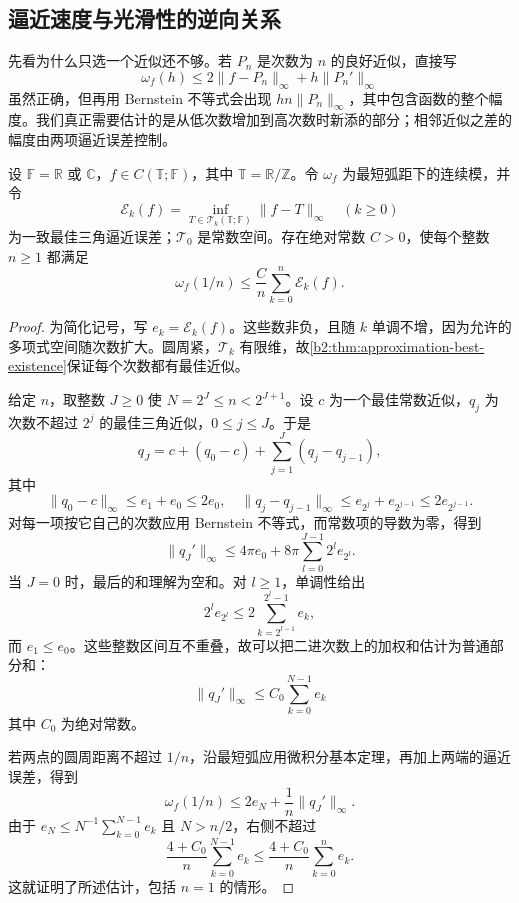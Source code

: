 \subsection{逼近速度与光滑性的逆向关系}
\label{b2:subsec:approximation-inverse-smoothness}

先看为什么只选一个近似还不够。若 \(P_n\) 是次数为 \(n\) 的良好近似，直接写
\[
 \omega_f(h)\leq2\lVert f-P_n\rVert_\infty
      +h\lVert P_n'\rVert_\infty
\]
虽然正确，但再用 Bernstein 不等式会出现 \(hn\lVert P_n\rVert_\infty\)，其中包含函数的整个幅度。我们真正需要估计的是从低次数增加到高次数时新添的部分；相邻近似之差的幅度由两项逼近误差控制。

\begin{theorem}[逼近误差的有限逆估计]
\label{b2:thm:approximation-inverse-estimate}
设 \(\mathbb F=\mathbb R\) 或 \(\mathbb C\)，\(f\in C(\mathbb T;\mathbb F)\)，其中 \(\mathbb T=\mathbb R/\mathbb Z\)。令 \(\omega_f\) 为最短弧距下的连续模，并令
\[
 \mathcal E_k(f)=\inf_{T\in\mathcal T_k(\mathbb T;\mathbb F)}
                    \lVert f-T\rVert_\infty
 \quad(k\geq0)
\]
为一致最佳三角逼近误差；\(\mathcal T_0\) 是常数空间。存在绝对常数 \(C>0\)，使每个整数 \(n\geq1\) 都满足
\[
 \omega_f(1/n)\leq\frac Cn\sum_{k=0}^n\mathcal E_k(f).
\]
\end{theorem}
\begin{proof}
为简化记号，写 \(e_k=\mathcal E_k(f)\)。这些数非负，且随 \(k\) 单调不增，因为允许的多项式空间随次数扩大。圆周紧，\(\mathcal T_k\) 有限维，故\cref{b2:thm:approximation-best-existence}保证每个次数都有最佳近似。

给定 \(n\)，取整数 \(J\geq0\) 使 \(N=2^J\leq n<2^{J+1}\)。设 \(c\) 为一个最佳常数近似，\(q_j\) 为次数不超过 \(2^j\) 的最佳三角近似，\(0\leq j\leq J\)。于是
\[
 q_J=c+(q_0-c)+\sum_{j=1}^J(q_j-q_{j-1}),
\]
其中
\[
 \lVert q_0-c\rVert_\infty\leq e_1+e_0\leq2e_0,
 \quad
 \lVert q_j-q_{j-1}\rVert_\infty
 \leq e_{2^j}+e_{2^{j-1}}\leq2e_{2^{j-1}}.
\]
对每一项按它自己的次数应用 Bernstein 不等式，而常数项的导数为零，得到
\[
 \lVert q_J'\rVert_\infty
 \leq4\pi e_0+8\pi\sum_{l=0}^{J-1}2^le_{2^l}.
\]
当 \(J=0\) 时，最后的和理解为空和。对 \(l\geq1\)，单调性给出
\[
 2^le_{2^l}\leq2\sum_{k=2^{l-1}}^{2^l-1}e_k,
\]
而 \(e_1\leq e_0\)。这些整数区间互不重叠，故可以把二进次数上的加权和估计为普通部分和：
\[
 \lVert q_J'\rVert_\infty
 \leq C_0\sum_{k=0}^{N-1}e_k
\]
其中 \(C_0\) 为绝对常数。

若两点的圆周距离不超过 \(1/n\)，沿最短弧应用微积分基本定理，再加上两端的逼近误差，得到
\[
 \omega_f(1/n)\leq2e_N+\frac1n\lVert q_J'\rVert_\infty.
\]
由于 \(e_N\leq N^{-1}\sum_{k=0}^{N-1}e_k\) 且 \(N>n/2\)，右侧不超过
\[
 \frac{4+C_0}{n}\sum_{k=0}^{N-1}e_k
 \leq\frac{4+C_0}{n}\sum_{k=0}^ne_k.
\]
这就证明了所述估计，包括 \(n=1\) 的情形。
\end{proof}

